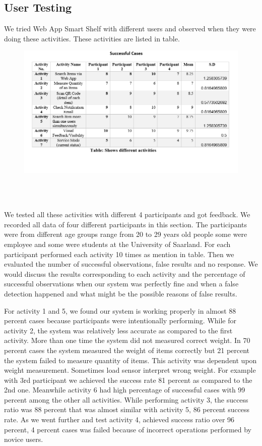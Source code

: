 \subsection{User Testing} 
We tried Web App Smart Shelf with different users and observed when they were doing these activities. These activities are listed in table.
%
\begin{figure}
	\includegraphics[width=1.1\columnwidth]{figures/Table}
	\caption{}~\label{fig:table}
\end{figure}
%
\\
We tested all these activities with different 4 participants and got feedback. We recorded all data of four different participants in this section. The participants were from different age groups range from 20 to 29 years old people some were employee and some were students at the University of Saarland. For each participant performed each activity 10 times as mention in table. Then we evaluated the number of successful observations, false results and no response. We would discuss the results corresponding to each activity and the percentage of successful observations when our system was perfectly fine and when a false detection happened and what might be the possible reasons of false results.

For activity 1 and 5, we found our system is working properly in almost 88 percent cases because participants were intentionally performing.
While for activity 2, the system was relatively less accurate as compared to the first activity. More than one time the system did not measured correct weight. In 70 percent cases the system measured the weight of items correctly but 21 percent the system failed to measure quantity of items. This activity was dependent upon weight measurement. Sometimes load sensor interpret wrong weight. For example with 3rd participant we achieved the success rate  81 percent as compared to the 2nd one. 
Meanwhile activity 6 had high percentage of successful cases with 99 percent among the other all activities.
While performing activity 3, the success ratio was 88 percent that was almost similar with activity 5, 86 percent success rate.
As we went further and test activity 4, achieved success ratio over 96 percent, 4 percent cases was failed because of incorrect operations performed by novice users.

